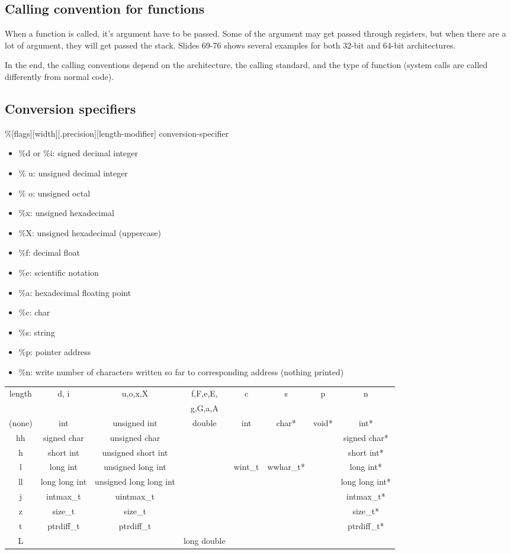 \documentclass[letterpaper]{article}
\newcommand{\p}{\vspace{1em}\par}		%
\begin{document}
\subsection{Calling convention for functions}
When a function is called, it's argument have to be passed. Some of the argument may get passed through registers, but when there are a lot of argument, they will get passed the stack. Slides 69-76 shows several examples for both 32-bit and 64-bit architectures.

\p In the end, the calling conventions depend on the architecture, the calling standard, and the type of function (system calls are called differently from normal code).

\subsection{Conversion specifiers}
\%[flags][width][.precision][{length-modifier}] conversion-specifier
\begin{itemize}
\item \%d or \%i: signed decimal integer
\item \% u: unsigned decimal integer
\item \% o: unsigned octal
\item \%x: unsigned hexadecimal
\item \%X: unsigned hexadecimal (uppercase)
\item \%f: decimal float
\item \%e: scientific notation
\item \%a: hexadecimal floating point
\item \%c: char
\item \%s: string
\item \%p: pointer address
\item \%n: write number of characters written so far to corresponding address (nothing printed)
\end{itemize}

\begin{table}[witdh=\textwidth]
\begin{tabular}{c|ccccccc}
length&d, i& u,o,x,X&f,F,e,E,& c & s & p & n\\
&&&g,G,a,A\\\hline
(none)&int& unsigned int& double&int&char*&void*&int*\\
hh&signed char& unsigned char&&&&&signed char*\\
h& short int&unsigned short int&&&&&short int*\\
l&long int&unsigned long int&&wint\_t&wwhar\_t*&&long int*\\
ll&long long int&unsigned long long int&&&&&long long int*\\
j&intmax\_t&uintmax\_t&&&&&intmax\_t*\\
z&size\_t&size\_t&&&&&size\_t*\\
t&ptrdiff\_t&ptrdiff\_t&&&&&ptrdiff\_t*\\
L&&&long double
\end{tabular}
\end{table}
\end{document}

